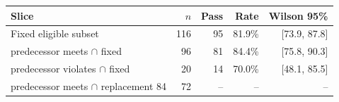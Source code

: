 \begin{tabular}{lrrrr}
\toprule
\textbf{Slice} & \textbf{$n$} & \textbf{Pass} & \textbf{Rate} & \textbf{Wilson 95\%} \\
\midrule
Fixed eligible subset & 116 & 95 & 81.9\% & [73.9, 87.8] \\
predecessor meets $\cap$ fixed & 96 & 81 & 84.4\% & [75.8, 90.3] \\
predecessor violates $\cap$ fixed & 20 & 14 & 70.0\% & [48.1, 85.5] \\
predecessor meets $\cap$ replacement 84 & 72 & -- & -- & -- \\
\bottomrule
\end{tabular}
